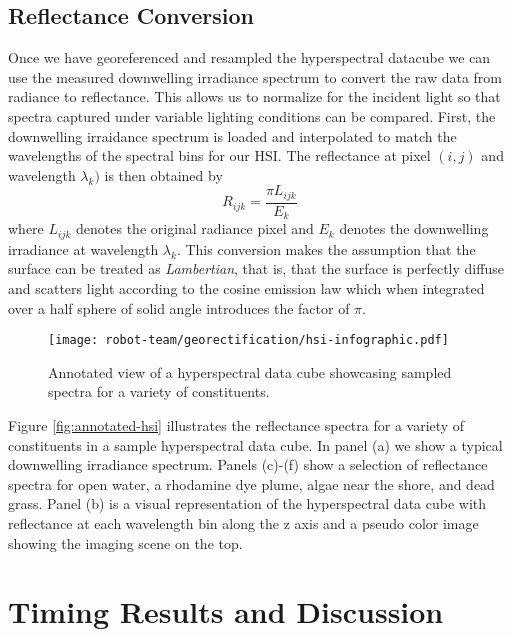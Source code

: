 \subsection{Reflectance Conversion}

Once we have georeferenced and resampled the hyperspectral datacube we can use the measured downwelling irradiance spectrum to convert the raw data from radiance to reflectance. This allows us to normalize for the incident light so that spectra captured under variable lighting conditions can be compared. First, the downwelling irraidance spectrum is loaded and interpolated to match the wavelengths of the spectral bins for our HSI. The reflectance at pixel $(i,j)$ and wavelength $\lambda_k)$ is then obtained by
\begin{equation}
  R_{ijk} = \frac{\pi L_{ijk}}{E_k}
\end{equation}
where $L_{ijk}$ denotes the original radiance pixel and $E_k$ denotes the downwelling irradiance at wavelength $\lambda_k$. This conversion makes the assumption that the surface can be treated as \textit{Lambertian}, that is, that the surface is perfectly diffuse and scatters light according to the cosine emission law which when integrated over a half sphere of solid angle introduces the factor of $\pi$.

\begin{figure}[h]
  \centering
  \texttt{[image: robot-team/georectification/hsi-infographic.pdf]}
  \caption{Annotated view of a hyperspectral data cube showcasing sampled spectra for a variety of constituents.\label{fig:hsi-infographic}}
  \label{fig:annoted-hsi}
\end{figure}  

Figure \ref{fig:annotated-hsi} illustrates the reflectance spectra for a variety of constituents in a sample hyperspectral data cube. In panel (a) we show a typical downwelling irradiance spectrum. Panels (c)-(f) show a selection of reflectance spectra for open water, a rhodamine dye plume, algae near the shore, and dead grass. Panel (b) is a visual representation of the hyperspectral data cube with reflectance at each wavelength bin along the z axis and a pseudo color image showing the imaging scene on the top.


\section{Timing Results and Discussion}

